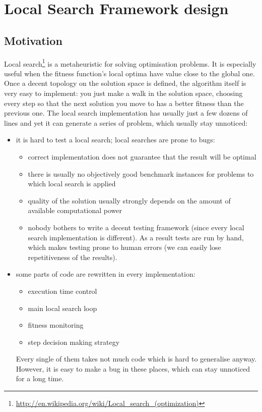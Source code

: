 \chapter{Local Search Framework design}

\section{Motivation}

Local search\footnote{\url{http://en.wikipedia.org/wiki/Local_search_(optimization)}} is a metaheuristic for solving optimisation problems.
It is especially useful when the fitness function's local optima have value close to the global one.
Once a decent topology on the solution space is defined, the algorithm itself is very easy to implement:
you just make a walk in the solution space, choosing every step so that the next solution you move to has
a better fitness than the previous one. The local search implementation has usually just a few dozens of lines and
yet it can generate a series of problem, which usually stay unnoticed:
\begin{itemize}
\item it is hard to test a local search; local searches are prone to bugs:
	\begin{itemize}
	\item correct implementation does not guarantee that the result will be optimal
	\item there is usually no objectively good benchmark instances for problems to which local search is applied
	\item quality of the solution usually strongly depends on the amount of available computational power
	\item nobody bothers to write a decent testing framework (since every local search implementation is different).
		As a result tests are run by hand, which makes testing prone to human errors (we can easily lose repetitiveness of the results).
	\end{itemize}
\item some parts of code are rewritten in every implementation:
	\begin{itemize}
	\item execution time control
	\item main local search loop
	\item fitness monitoring
	\item step decision making strategy
	\end{itemize}
	Every single of them takes not much code which is hard to generalise anyway.
	However, it is easy to make a bug in these places, which can stay unnoticed for a long time.
\end{itemize}

